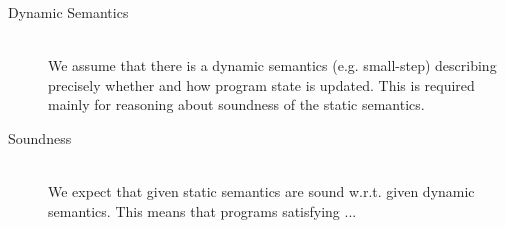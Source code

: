 \begin{description}
    \item[Dynamic Semantics]~\\
    We assume that there is a dynamic semantics (e.g. small-step) describing precisely whether and how program state is updated.
    This is required mainly for reasoning about soundness of the static semantics.
    
    \item[Soundness]~\\
    We expect that given static semantics are sound w.r.t. given dynamic semantics.
    This means that programs satisfying ... 
\end{description}
